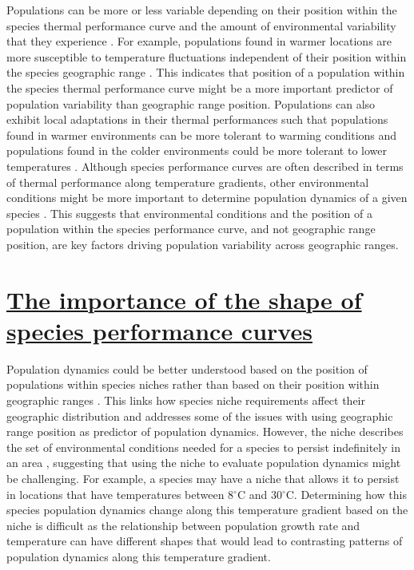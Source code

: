 Populations can be more or less variable depending on their position within the species thermal performance curve and the amount of environmental variability that they experience \parencite{lawson2015, evans2022}. For example, populations found in warmer locations are more susceptible to temperature fluctuations independent of their position within the species geographic range \parencite{beaty2023,lewis2023}. This indicates that position of a population within the species thermal performance curve might be a more important predictor of population variability than geographic range position. Populations can also exhibit local adaptations in their thermal performances such that populations found in warmer environments can be more tolerant to warming conditions \parencite{herrando2019} and populations found in the colder environments could be more tolerant to lower temperatures \parencite{chiba2016}. Although species performance curves are often described in terms of thermal performance along temperature gradients, other environmental conditions might be more important to determine population dynamics of a given species \parencite{chambers2018}. This suggests that environmental conditions and the position of a population within the species performance curve, and not geographic range position, are key factors driving population variability across geographic ranges. 


\section*{\textbf{\underline{The importance of the shape of species performance curves}}}

Population dynamics could be better understood based on the position of populations within species niches rather than based on their position within geographic ranges \parencite{yanez2012,martinez2013}. This links how species niche requirements affect their geographic distribution \parencite{pulliam2000} and addresses some of the issues with using geographic range position as predictor of population dynamics. However, the niche describes the set of environmental conditions needed for a species to persist indefinitely in an area \parencite{hutchinson1957}, suggesting that using the niche to evaluate population dynamics might be challenging. For example, a species may have a niche that allows it to persist in locations that have temperatures between 8$^{\circ}$C and 30$^{\circ}$C. Determining how this species population dynamics change along this temperature gradient based on the niche is difficult as the relationship between population growth rate and temperature can have different shapes that would lead to contrasting patterns of population dynamics along this temperature gradient.
 
